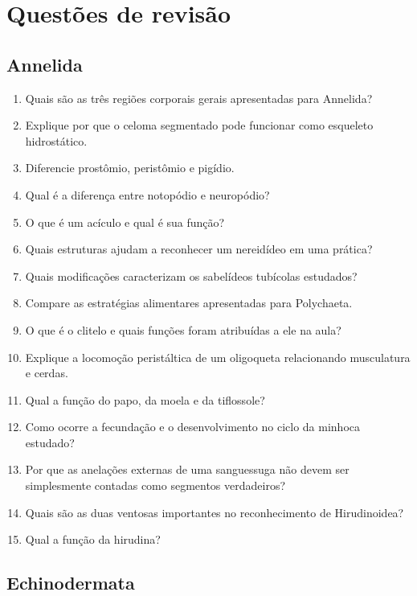 \documentclass[a4paper,12pt]{article}
\begin{document}
\section{Questões de revisão}

\subsection*{Annelida}

\begin{enumerate}
  \item Quais são as três regiões corporais gerais apresentadas para Annelida?
  \item Explique por que o celoma segmentado pode funcionar como esqueleto hidrostático.
  \item Diferencie prostômio, peristômio e pigídio.
  \item Qual é a diferença entre notopódio e neuropódio?
  \item O que é um acículo e qual é sua função?
  \item Quais estruturas ajudam a reconhecer um nereidídeo em uma prática?
  \item Quais modificações caracterizam os sabelídeos tubícolas estudados?
  \item Compare as estratégias alimentares apresentadas para Polychaeta.
  \item O que é o clitelo e quais funções foram atribuídas a ele na aula?
  \item Explique a locomoção peristáltica de um oligoqueta relacionando musculatura e cerdas.
  \item Qual a função do papo, da moela e da tiflossole?
  \item Como ocorre a fecundação e o desenvolvimento no ciclo da minhoca estudado?
  \item Por que as anelações externas de uma sanguessuga não devem ser simplesmente contadas como segmentos verdadeiros?
  \item Quais são as duas ventosas importantes no reconhecimento de Hirudinoidea?
  \item Qual a função da hirudina?
\end{enumerate}

\subsection*{Echinodermata}
\end{document}
